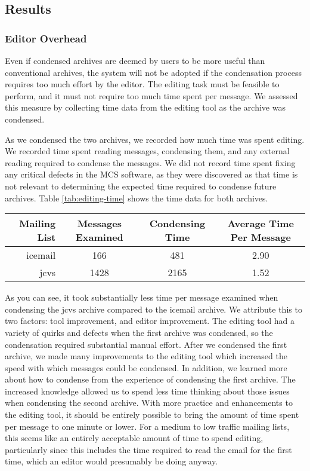 \subsection{Results}

\subsubsection{Editor Overhead}
Even if condensed archives are deemed by users to be more useful than
conventional archives, the system will not be adopted if the condensation
process requires too much effort by the editor. The editing task must be
feasible to perform, and it must not require too much time spent per message.
We assessed this measure by collecting time data from the editing tool as the
archive was condensed.

As we condensed the two archives, we recorded how much time was spent editing.
We recorded time spent reading messages, condensing them, and any external
reading required to condense the messages. We did not record time spent fixing
any critical defects in the MCS software, as they were discovered as that time
is not relevant to determining the expected time required to condense future
archives. Table \ref{tab:editing-time} shows the time data for both archives.

\begin{table*}[htbp]
  \begin{center}
    \begin{tabular} {|r|c|c|c|} \hline
      {\bf Mailing List} & {\bf Messages Examined} & {\bf Condensing Time} &
      {\bf Average Time Per Message}\\ \hline\hline
      icemail & 166 & 481 & 2.90\\ \hline
      jcvs & 1428 & 2165 & 1.52\\ \hline
    \end{tabular}
    \caption{Editing time results for two condensed archives (all times in minutes)}
    \label{tab:editing-time}
  \end{center}
\end{table*}

As you can see, it took substantially less time per message examined when
condensing the jcvs archive compared to the icemail archive. We attribute this
to two factors: tool improvement, and editor improvement. The editing tool had
a variety of quirks and defects when the first archive was condensed, so the
condensation required substantial manual effort. After we condensed the first
archive, we made many improvements to the editing tool which increased the
speed with which messages could be condensed. In addition, we learned more
about how to condense from the experience of condensing the first archive. The
increased knowledge allowed us to spend less time thinking about those issues
when condensing the second archive. With more practice and enhancements to the
editing tool, it should be entirely possible to bring the amount of time spent
per message to one minute or lower. For a medium to low traffic mailing lists,
this seems like an entirely acceptable amount of time to spend editing,
particularly since this includes the time required to read the email for the
first time, which an editor would presumably be doing anyway.


